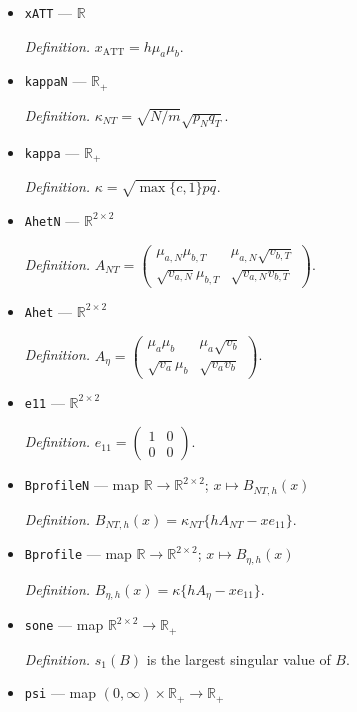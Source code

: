 \documentclass{article}
\begin{document}
\begin{itemize}
  \item \texttt{xATT} --- \(\mathbb R\)
  \par\smallskip\noindent\emph{Definition.} \(x_{\operatorname{ATT}}=h\mu_a\mu_b\).
  \item \texttt{kappaN} --- \(\mathbb R_{+}\)
  \par\smallskip\noindent\emph{Definition.} \(\kappa_{NT}=\sqrt{N/m}\sqrt{p_Nq_T}\).
  \item \texttt{kappa} --- \(\mathbb R_{+}\)
  \par\smallskip\noindent\emph{Definition.} \(\kappa=\sqrt{\max\{c,1\}pq}\).
  \item \texttt{AhetN} --- \(\mathbb R^{2\times2}\)
  \par\smallskip\noindent\emph{Definition.} \(A_{NT}=\begin{pmatrix}\mu_{a,N}\mu_{b,T}&\mu_{a,N}\sqrt{v_{b,T}}\\\sqrt{v_{a,N}}\mu_{b,T}&\sqrt{v_{a,N}v_{b,T}}\end{pmatrix}\).
  \item \texttt{Ahet} --- \(\mathbb R^{2\times2}\)
  \par\smallskip\noindent\emph{Definition.} \(A_{\eta}=\begin{pmatrix}\mu_a\mu_b&\mu_a\sqrt{v_b}\\\sqrt{v_a}\mu_b&\sqrt{v_av_b}\end{pmatrix}\).
  \item \texttt{e11} --- \(\mathbb R^{2\times2}\)
  \par\smallskip\noindent\emph{Definition.} \(e_{11}=\begin{pmatrix}1&0\\0&0\end{pmatrix}\).
  \item \texttt{BprofileN} --- map \(\mathbb R\to\mathbb R^{2\times2}\); \(x\mapsto B_{NT,h}(x)\)
  \par\smallskip\noindent\emph{Definition.} \(B_{NT,h}(x)=\kappa_{NT}\{hA_{NT}-xe_{11}\}\).
  \item \texttt{Bprofile} --- map \(\mathbb R\to\mathbb R^{2\times2}\); \(x\mapsto B_{\eta,h}(x)\)
  \par\smallskip\noindent\emph{Definition.} \(B_{\eta,h}(x)=\kappa\{hA_{\eta}-xe_{11}\}\).
  \item \texttt{sone} --- map \(\mathbb R^{2\times2}\to\mathbb R_{+}\)
  \par\smallskip\noindent\emph{Definition.} \(s_1(B)\) is the largest singular value of \(B\).
  \item \texttt{psi} --- map \((0,\infty)\times\mathbb R_{+}\to\mathbb R_{+}\)

\end{itemize}
\end{document}
